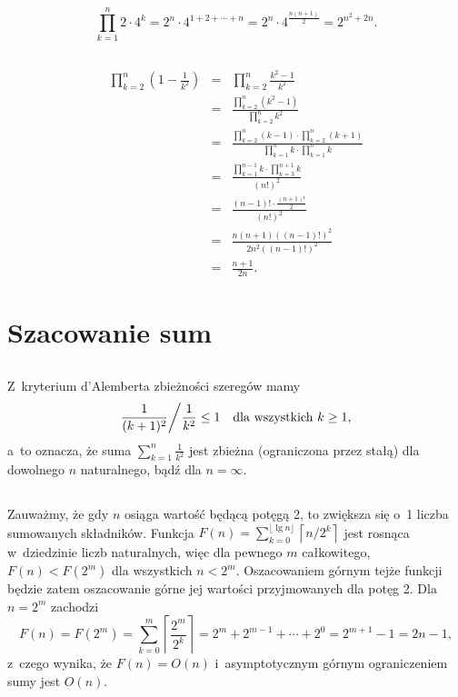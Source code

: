\subsection{} %
\[
	\prod_{k=1}^n2\cdot 4^k = 2^n\cdot 4^{1+2+\cdots+n} = 2^n\cdot 4^{\frac{n(n+1)}{2}} = 2^{n^2+2n}.
\]

\subsection{} %
\begin{eqnarray*}
	\prod_{k=2}^n\left(1-\frac{1}{k^2}\right) &=& \prod_{k=2}^n\frac{k^2-1}{k^2} \\
	&=& \frac{\prod_{k=2}^n(k^2-1)}{\prod_{k=2}^nk^2} \\
	&=& \frac{\prod_{k=2}^n(k-1)\cdot\prod_{k=2}^n(k+1)}{\prod_{k=1}^nk\cdot\prod_{k=1}^nk} \\
	&=& \frac{\prod_{k=1}^{n-1}k\cdot\prod_{k=3}^{n+1}k}{(n!)^2} \\
	&=& \frac{(n-1)!\cdot\frac{(n+1)!}{2}}{(n!)^2} \\
	&=& \frac{n(n+1)((n-1)!)^2}{2n^2((n-1)!)^2} \\
	&=& \frac{n+1}{2n}.
\end{eqnarray*}

\section{Szacowanie sum}

\subsection{} %
Z~kryterium d'Alemberta zbieżności szeregów mamy
\[
	\frac{1}{(k+1)^2}\bigg/\frac{1}{k^2} \le 1\quad\hbox{dla wszystkich }k\ge1,
\]
a~to oznacza, że suma $\sum_{k=1}^n\frac{1}{k^2}$ jest zbieżna (ograniczona przez stałą) dla dowolnego $n$ naturalnego, bądź dla $n=\infty$.

\subsection{} %
Zauważmy, że gdy $n$ osiąga wartość będącą potęgą 2, to zwiększa się o~1 liczba sumowanych składników. Funkcja $F(n)=\sum_{k=0}^{\lfloor\lg n\rfloor}\left\lceil n/2^k\right\rceil$ jest rosnąca w~dziedzinie liczb naturalnych, więc dla pewnego $m$ całkowitego, $F(n)<F(2^m)$ dla wszystkich $n<2^m$. Oszacowaniem górnym tejże funkcji będzie zatem oszacowanie górne jej wartości przyjmowanych dla potęg 2. Dla $n=2^m$ zachodzi
\[
	F(n) = F(2^m) = \sum_{k=0}^m\left\lceil\frac{2^m}{2^k}\right\rceil = 2^m+2^{m-1}+\cdots+2^0 = 2^{m+1}-1 = 2n-1,
\]
z~czego wynika, że $F(n)=O(n)$ i~asymptotycznym górnym ograniczeniem sumy jest $O(n)$.

